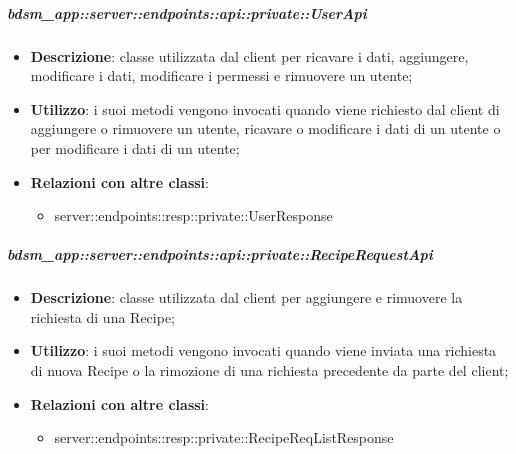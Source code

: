     \subparagraph{bdsm\_app::server::endpoints::api::private::UserApi} %
    \label{subp:bdsm_app_server_endpoints_api_private_userapi}
    \begin{itemize}
      \item \textbf{Descrizione}: classe utilizzata dal client per ricavare i dati, aggiungere, modificare i dati, modificare i permessi e rimuovere un utente;
      \item \textbf{Utilizzo}: i suoi metodi vengono invocati quando viene richiesto dal client di aggiungere o rimuovere un utente, ricavare o modificare i dati di un utente o per modificare i dati di un utente;
      \item \textbf{Relazioni con altre classi}:
        \begin{itemize}
          \item server::endpoints::resp::private::UserResponse
        \end{itemize}
      \end{itemize}
    
    \subparagraph{bdsm\_app::server::endpoints::api::private::RecipeRequestApi} %
    \label{subp:bdsm_app_server_endpoints_api_private::reciperequestapi}
    \begin{itemize}
      \item \textbf{Descrizione}: classe utilizzata dal client per aggiungere e rimuovere la richiesta di una Recipe;
      \item \textbf{Utilizzo}: i suoi metodi vengono invocati quando viene inviata una richiesta di nuova Recipe o la rimozione di una richiesta precedente da parte del client;
      \item \textbf{Relazioni con altre classi}:
        \begin{itemize}
          \item server::endpoints::resp::private::RecipeReqListResponse
        \end{itemize}
      \end{itemize}
    
